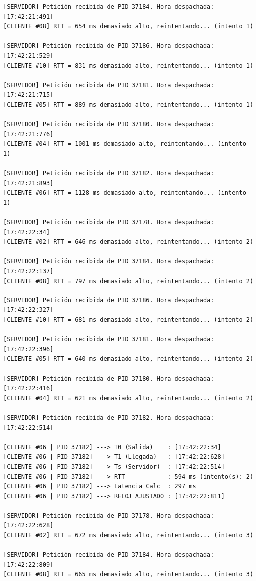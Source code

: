 \begin{lstlisting}[style=estiloC]
[SERVIDOR] Petición recibida de PID 37184. Hora despachada: [17:42:21:491]
[CLIENTE #08] RTT = 654 ms demasiado alto, reintentando... (intento 1)

[SERVIDOR] Petición recibida de PID 37186. Hora despachada: [17:42:21:529]
[CLIENTE #10] RTT = 831 ms demasiado alto, reintentando... (intento 1)

[SERVIDOR] Petición recibida de PID 37181. Hora despachada: [17:42:21:715]
[CLIENTE #05] RTT = 889 ms demasiado alto, reintentando... (intento 1)

[SERVIDOR] Petición recibida de PID 37180. Hora despachada: [17:42:21:776]
[CLIENTE #04] RTT = 1001 ms demasiado alto, reintentando... (intento 1)

[SERVIDOR] Petición recibida de PID 37182. Hora despachada: [17:42:21:893]
[CLIENTE #06] RTT = 1128 ms demasiado alto, reintentando... (intento 1)

[SERVIDOR] Petición recibida de PID 37178. Hora despachada: [17:42:22:34]
[CLIENTE #02] RTT = 646 ms demasiado alto, reintentando... (intento 2)

[SERVIDOR] Petición recibida de PID 37184. Hora despachada: [17:42:22:137]
[CLIENTE #08] RTT = 797 ms demasiado alto, reintentando... (intento 2)

[SERVIDOR] Petición recibida de PID 37186. Hora despachada: [17:42:22:327]
[CLIENTE #10] RTT = 681 ms demasiado alto, reintentando... (intento 2)

[SERVIDOR] Petición recibida de PID 37181. Hora despachada: [17:42:22:396]
[CLIENTE #05] RTT = 640 ms demasiado alto, reintentando... (intento 2)

[SERVIDOR] Petición recibida de PID 37180. Hora despachada: [17:42:22:416]
[CLIENTE #04] RTT = 621 ms demasiado alto, reintentando... (intento 2)

[SERVIDOR] Petición recibida de PID 37182. Hora despachada: [17:42:22:514]

[CLIENTE #06 | PID 37182] ---> T0 (Salida)    : [17:42:22:34]
[CLIENTE #06 | PID 37182] ---> T1 (Llegada)   : [17:42:22:628]
[CLIENTE #06 | PID 37182] ---> Ts (Servidor)  : [17:42:22:514]
[CLIENTE #06 | PID 37182] ---> RTT            : 594 ms (intento(s): 2)
[CLIENTE #06 | PID 37182] ---> Latencia Calc  : 297 ms
[CLIENTE #06 | PID 37182] ---> RELOJ AJUSTADO : [17:42:22:811]

[SERVIDOR] Petición recibida de PID 37178. Hora despachada: [17:42:22:628]
[CLIENTE #02] RTT = 672 ms demasiado alto, reintentando... (intento 3)

[SERVIDOR] Petición recibida de PID 37184. Hora despachada: [17:42:22:809]
[CLIENTE #08] RTT = 665 ms demasiado alto, reintentando... (intento 3)


\end{lstlisting}
